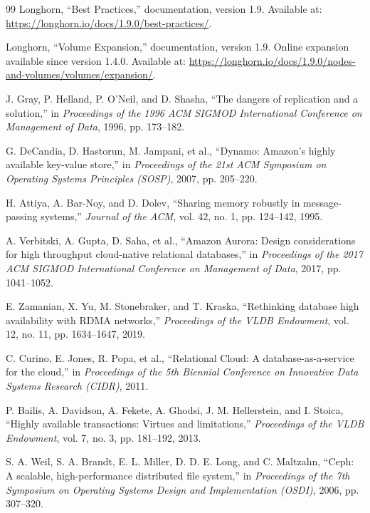 \documentclass[11pt,a4paper]{article}
\begin{document}
\begin{thebibliography}{99}
Longhorn, ``Best Practices,'' documentation, version 1.9. Available at: \url{https://longhorn.io/docs/1.9.0/best-practices/}.

Longhorn, ``Volume Expansion,'' documentation, version 1.9. Online expansion available since version 1.4.0. Available at: \url{https://longhorn.io/docs/1.9.0/nodes-and-volumes/volumes/expansion/}.

J. Gray, P. Helland, P. O'Neil, and D. Shasha, ``The dangers of replication and a solution,'' in \emph{Proceedings of the 1996 ACM SIGMOD International Conference on Management of Data}, 1996, pp. 173--182.

G. DeCandia, D. Hastorun, M. Jampani, et al., ``Dynamo: Amazon's highly available key-value store,'' in \emph{Proceedings of the 21st ACM Symposium on Operating Systems Principles (SOSP)}, 2007, pp. 205--220.

H. Attiya, A. Bar-Noy, and D. Dolev, ``Sharing memory robustly in message-passing systems,'' \emph{Journal of the ACM}, vol. 42, no. 1, pp. 124--142, 1995.

A. Verbitski, A. Gupta, D. Saha, et al., ``Amazon Aurora: Design considerations for high throughput cloud-native relational databases,'' in \emph{Proceedings of the 2017 ACM SIGMOD International Conference on Management of Data}, 2017, pp. 1041--1052.

E. Zamanian, X. Yu, M. Stonebraker, and T. Kraska, ``Rethinking database high availability with RDMA networks,'' \emph{Proceedings of the VLDB Endowment}, vol. 12, no. 11, pp. 1634--1647, 2019.

C. Curino, E. Jones, R. Popa, et al., ``Relational Cloud: A database-as-a-service for the cloud,'' in \emph{Proceedings of the 5th Biennial Conference on Innovative Data Systems Research (CIDR)}, 2011.

P. Bailis, A. Davidson, A. Fekete, A. Ghodsi, J. M. Hellerstein, and I. Stoica, ``Highly available transactions: Virtues and limitations,'' \emph{Proceedings of the VLDB Endowment}, vol. 7, no. 3, pp. 181--192, 2013.

S. A. Weil, S. A. Brandt, E. L. Miller, D. D. E. Long, and C. Maltzahn, ``Ceph: A scalable, high-performance distributed file system,'' in \emph{Proceedings of the 7th Symposium on Operating Systems Design and Implementation (OSDI)}, 2006, pp. 307--320.

\end{thebibliography}
\end{document}
